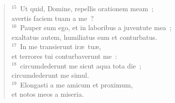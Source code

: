 \begin{flushleft}
\begin{verse}
${}^{15}$~Ut quid, Domine, repellis orationem meam~;\\ avertis faciem tuam a me~?\\
${}^{16}$~Pauper sum ego, et in laboribus a juventute mea~;\\ exaltatus autem, humiliatus sum et conturbatus.\\
${}^{17}$~In me transierunt ir\ae\ tu\ae ,\\ et terrores tui conturbaverunt me~:\\
${}^{18}$~circumdederunt me sicut aqua tota die~;\\ circumdederunt me simul.\\
${}^{19}$~Elongasti a me amicum et proximum,\\ et notos meos a miseria.\end{verse}\end{flushleft}



